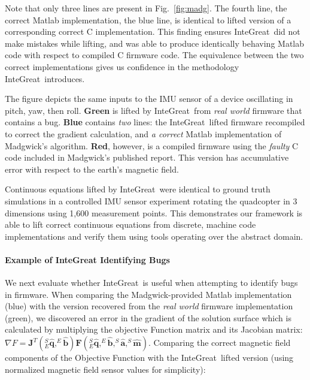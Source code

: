 Note that only three lines are present in Fig.~\ref{fig:madg}.
The fourth line, the correct Matlab implementation, the blue line, is identical to lifted version of a corresponding correct C implementation.
This finding ensures InteGreat\ did not make mistakes while lifting, and was able to produce identically behaving Matlab code with respect to compiled C firmware code.
The equivalence between the two correct implementations gives us confidence in the methodology InteGreat\ introduces.

The figure depicts the same inputs to the IMU sensor of a device oscillating in pitch, yaw, then roll. \textbf{Green} is lifted by InteGreat\ from \emph{real world} firmware that contains a bug. \textbf{Blue} contains \emph{two} lines: the InteGreat\ lifted firmware recompiled to correct the gradient calculation, and \emph{a correct} Matlab implementation of Madgwick's algorithm. \textbf{Red}, however, is a compiled firmware using the \emph{faulty} C code included in Madgwick's published report. This version has accumulative error with respect to the earth's magnetic field.

Continuous equations lifted by InteGreat\ were identical to ground truth simulations in a controlled IMU sensor experiment rotating the quadcopter in 3 dimensions using 1,600 measurement points. This demonstrates our framework is able to lift correct continuous equations from discrete, machine code implementations and verify them using tools operating over the abstract domain.

\paragraph{Example of InteGreat Identifying Bugs}
\label{sec:quadcopter}


We next evaluate whether InteGreat\ is useful when attempting to identify bugs in firmware.
When comparing the Madgwick-provided Matlab implementation (blue) with the version recovered from the \emph{real world} firmware implementation (green), we discovered an error in the gradient of the solution surface which is calculated by multiplying the objective Function matrix and its Jacobian matrix: $\nabla F = \mathbf{J}^T(_{E}^{S}\hat{\mathbf{q}},^{E}\hat{\mathbf{b}}) \mathbf{F}(_{E}^{S}\hat{\mathbf{q}},^{E}\hat{\mathbf{b}}, ^{S}\hat{\mathbf{a}}, ^{S}\hat{\mathbf{m}})$.
Comparing the correct magnetic field components of the Objective Function with the InteGreat\ lifted version (using normalized magnetic field sensor values for simplicity):

